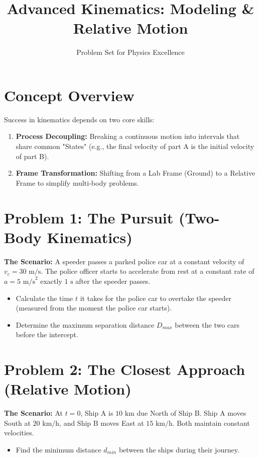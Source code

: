 \documentclass[11pt]{article}
\title{\textbf{Advanced Kinematics: Modeling \& Relative Motion}}
\author{Problem Set for Physics Excellence}
\date{}
\begin{document}
\maketitle

\section*{Concept Overview}
Success in kinematics depends on two core skills:
\begin{enumerate}
    \item \textbf{Process Decoupling:} Breaking a continuous motion into intervals that share common "States" (e.g., the final velocity of part A is the initial velocity of part B).
    \item \textbf{Frame Transformation:} Shifting from a Lab Frame (Ground) to a Relative Frame to simplify multi-body problems.
\end{enumerate}


\section*{Problem 1: The Pursuit (Two-Body Kinematics)}
\textbf{The Scenario:} A speeder passes a parked police car at a constant velocity of $v_c = 30 \text{ m/s}$. The police officer starts to accelerate from rest at a constant rate of $a = 5 \text{ m/s}^2$ exactly $1 \text{ s}$ after the speeder passes.

\begin{itemize}
    \item[(a)] Calculate the time $t$ it takes for the police car to overtake the speeder (measured from the moment the police car starts).
    \item[(b)] Determine the maximum separation distance $D_{max}$ between the two cars before the intercept.
\end{itemize}


\section*{Problem 2: The Closest Approach (Relative Motion)}
\textbf{The Scenario:} At $t = 0$, Ship A is $10 \text{ km}$ due North of Ship B. Ship A moves South at $20 \text{ km/h}$, and Ship B moves East at $15 \text{ km/h}$. Both maintain constant velocities.

\begin{itemize}
    \item[(a)] Find the minimum distance $d_{min}$ between the ships during their journey.
\end{itemize}
\end{document}
